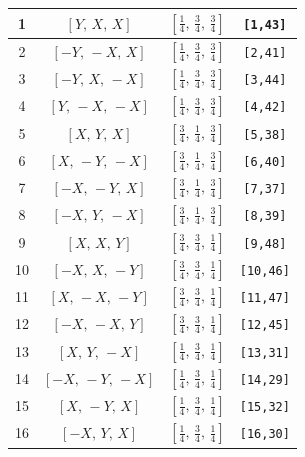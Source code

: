 \documentclass[fleqn,8pt]{jsarticle}
\begin{document}
\begin{longtable}{cccc}
1 & $\left[ Y,\, X,\, X \right]$ & $\left[ \frac{1}{4},\, \frac{3}{4},\, \frac{3}{4} \right]$ & {\tt [1,43]} \\ \hline
2 & $\left[ - Y,\, - X,\, X \right]$ & $\left[ \frac{1}{4},\, \frac{3}{4},\, \frac{3}{4} \right]$ & {\tt [2,41]} \\ \hline
3 & $\left[ - Y,\, X,\, - X \right]$ & $\left[ \frac{1}{4},\, \frac{3}{4},\, \frac{3}{4} \right]$ & {\tt [3,44]} \\ \hline
4 & $\left[ Y,\, - X,\, - X \right]$ & $\left[ \frac{1}{4},\, \frac{3}{4},\, \frac{3}{4} \right]$ & {\tt [4,42]} \\ \hline
5 & $\left[ X,\, Y,\, X \right]$ & $\left[ \frac{3}{4},\, \frac{1}{4},\, \frac{3}{4} \right]$ & {\tt [5,38]} \\ \hline
6 & $\left[ X,\, - Y,\, - X \right]$ & $\left[ \frac{3}{4},\, \frac{1}{4},\, \frac{3}{4} \right]$ & {\tt [6,40]} \\ \hline
7 & $\left[ - X,\, - Y,\, X \right]$ & $\left[ \frac{3}{4},\, \frac{1}{4},\, \frac{3}{4} \right]$ & {\tt [7,37]} \\ \hline
8 & $\left[ - X,\, Y,\, - X \right]$ & $\left[ \frac{3}{4},\, \frac{1}{4},\, \frac{3}{4} \right]$ & {\tt [8,39]} \\ \hline
9 & $\left[ X,\, X,\, Y \right]$ & $\left[ \frac{3}{4},\, \frac{3}{4},\, \frac{1}{4} \right]$ & {\tt [9,48]} \\ \hline
10 & $\left[ - X,\, X,\, - Y \right]$ & $\left[ \frac{3}{4},\, \frac{3}{4},\, \frac{1}{4} \right]$ & {\tt [10,46]} \\ \hline
11 & $\left[ X,\, - X,\, - Y \right]$ & $\left[ \frac{3}{4},\, \frac{3}{4},\, \frac{1}{4} \right]$ & {\tt [11,47]} \\ \hline
12 & $\left[ - X,\, - X,\, Y \right]$ & $\left[ \frac{3}{4},\, \frac{3}{4},\, \frac{1}{4} \right]$ & {\tt [12,45]} \\ \hline
13 & $\left[ X,\, Y,\, - X \right]$ & $\left[ \frac{1}{4},\, \frac{3}{4},\, \frac{1}{4} \right]$ & {\tt [13,31]} \\ \hline
14 & $\left[ - X,\, - Y,\, - X \right]$ & $\left[ \frac{1}{4},\, \frac{3}{4},\, \frac{1}{4} \right]$ & {\tt [14,29]} \\ \hline
15 & $\left[ X,\, - Y,\, X \right]$ & $\left[ \frac{1}{4},\, \frac{3}{4},\, \frac{1}{4} \right]$ & {\tt [15,32]} \\ \hline
16 & $\left[ - X,\, Y,\, X \right]$ & $\left[ \frac{1}{4},\, \frac{3}{4},\, \frac{1}{4} \right]$ & {\tt [16,30]} \\ \hline

\end{longtable}
\end{document}

